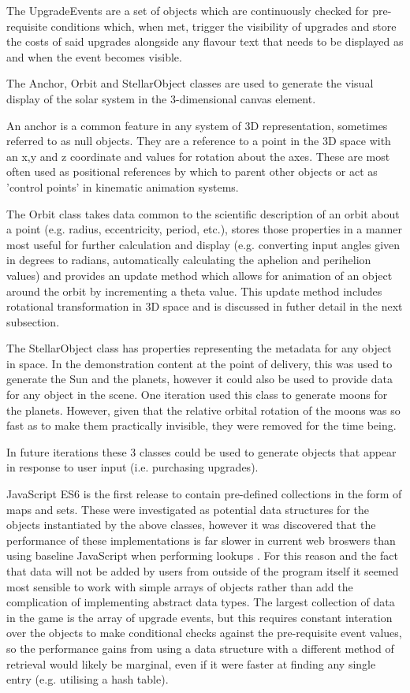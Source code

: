 \documentclass[twoside]{bhamthesis}
\begin{document}
The UpgradeEvents are a set of objects which are continuously checked for pre-requisite conditions which, when met, trigger the visibility of upgrades and store the costs of said upgrades alongside any flavour text that needs to be displayed as and when the event becomes visible.

The Anchor, Orbit and StellarObject classes are used to generate the visual display of the solar system in the 3-dimensional canvas element.

An anchor is a common feature in any system of 3D representation, sometimes referred to as null objects. They are a reference to a point in the 3D space with an x,y and z coordinate and values for rotation about the axes. These are most often used as positional references by which to parent other objects or act as 'control points' in kinematic animation systems.

The Orbit class takes data common to the scientific description of an orbit about a point (e.g. radius, eccentricity, period, etc.), stores those properties in a manner most useful for further calculation and display (e.g. converting input angles given in degrees to radians, automatically calculating the aphelion and perihelion values) and provides an update method which allows for animation of an object around the orbit by incrementing a theta value. This update method includes rotational transformation in 3D space and is discussed in futher detail in the next subsection.

The StellarObject class has properties representing the metadata for any object in space. In the demonstration content at the point of delivery, this was used to generate the Sun and the planets, however it could also be used to provide data for any object in the scene. One iteration used this class to generate moons for the planets. However, given that the relative orbital rotation of the moons was so fast as to make them practically invisible, they were removed for the time being.

In future iterations these 3 classes could be used to generate objects that appear in response to user input (i.e. purchasing upgrades).

JavaScript ES6 is the first release to contain pre-defined collections in the form of maps and sets. These were investigated as potential data structures for the objects instantiated by the above classes, however it was discovered that the performance of these implementations is far slower in current web broswers than using baseline JavaScript when performing lookups \cite{decker_six_2017}. For this reason and the fact that data will not be added by users from outside of the program itself it seemed most sensible to work with simple arrays of objects rather than add the complication of implementing abstract data types. The largest collection of data in the game is the array of upgrade events, but this requires constant interation over the objects to make conditional checks against the pre-requisite event values, so the performance gains from using a data structure with a different method of retrieval would likely be marginal, even if it were faster at finding any single entry (e.g. utilising a hash table).
\end{document}
